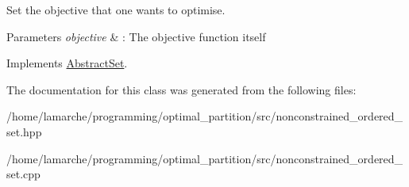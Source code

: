 Set the objective that one wants to optimise. 


\begin{DoxyParams}{Parameters}
{\em objective} & \-: The objective function itself \\
\hline
\end{DoxyParams}


Implements \hyperlink{classAbstractSet_a7aef71679a18ab7965d1098da15b26c2}{Abstract\-Set}.



The documentation for this class was generated from the following files\-:\begin{DoxyCompactItemize}
\item 
/home/lamarche/programming/optimal\-\_\-partition/src/nonconstrained\-\_\-ordered\-\_\-set.\-hpp\item 
/home/lamarche/programming/optimal\-\_\-partition/src/nonconstrained\-\_\-ordered\-\_\-set.\-cpp\end{DoxyCompactItemize}
